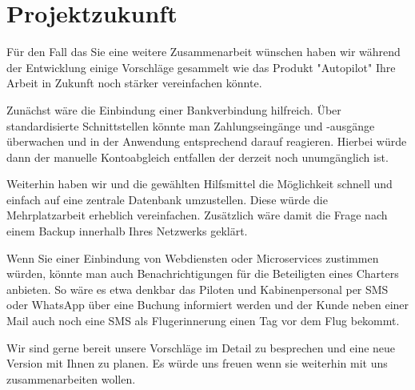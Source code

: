 \documentclass[12pt]{article}
\begin{document}
\newpage
\section{Projektzukunft}

Für den Fall das Sie eine weitere Zusammenarbeit wünschen haben wir während der Entwicklung einige Vorschläge gesammelt wie das Produkt "Autopilot" Ihre Arbeit in Zukunft noch stärker vereinfachen könnte.
\newline

Zunächst wäre die Einbindung einer Bankverbindung hilfreich. Über standardisierte Schnittstellen könnte man Zahlungseingänge und -ausgänge überwachen und in der Anwendung entsprechend darauf reagieren. Hierbei würde dann der manuelle Kontoabgleich entfallen der derzeit noch unumgänglich ist.
\newline

Weiterhin haben wir und die gewählten Hilfsmittel die Möglichkeit schnell und einfach auf eine zentrale Datenbank umzustellen. Diese würde die Mehrplatzarbeit erheblich vereinfachen. Zusätzlich wäre damit die Frage nach einem Backup innerhalb Ihres Netzwerks geklärt.
\newline

Wenn Sie einer Einbindung von Webdiensten oder Microservices zustimmen würden, könnte man auch Benachrichtigungen für die Beteiligten eines Charters anbieten. So wäre es etwa denkbar das Piloten und Kabinenpersonal per SMS oder WhatsApp über eine Buchung informiert werden und der Kunde neben einer Mail auch noch eine SMS als Flugerinnerung einen Tag vor dem Flug bekommt.
\newline

Wir sind gerne bereit unsere Vorschläge im Detail zu besprechen und eine neue Version mit Ihnen zu planen. Es würde uns freuen wenn sie weiterhin mit uns zusammenarbeiten wollen.
\end{document}
